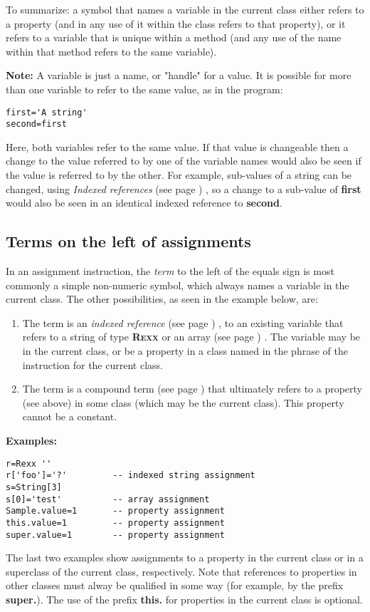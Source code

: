 To summarize: a symbol that names a variable in the current class either
refers to a property (and in any use of it within the class refers to
that property), or it refers to a variable that is unique within a
method (and any use of the name within that method refers to the same
variable).
\begin{shaded}\noindent
\textbf{Note: }
A variable is just a name, or "handle" for a value.
It is possible for more than one variable to refer to the same value, as
in the program:
\begin{lstlisting}
first='A string'
second=first
\end{lstlisting}
Here, both variables refer to the same value.  If that value is
changeable then a change to the value referred to by one of the
variable names would also be seen if the value is referred to by the
other.
For example, sub-values of a \nr{} string can be changed, using
 \emph{Indexed references} (see page \pageref{refinstr}) , so a change to a
sub-value of \textbf{first} would also be seen in an identical indexed
reference to \textbf{second}.
\end{shaded}\indent
\subsection{Terms on the left of assignments}
 
In an assignment instruction, the \emph{term} to the left of the
equals sign is most commonly a simple non-numeric symbol, which
always names a variable in the current class.
The other possibilities, as seen in the example below, are:
\begin{enumerate}
\item 
The term is an  \emph{indexed reference} (see page \pageref{refinstr}) , to an
existing variable that refers to a string of type \textbf{R\textsc{exx}} or an
 array (see page \pageref{refarray}) .
The variable may be in the current class, or be a property in a class
named in the  phrase of the  instruction for
the current class.
\item 
The term is a  compound term (see page \pageref{refcomterm})  that ultimately refers
to a property (see above) in some class (which may be the current class).
This property cannot be a constant.
\end{enumerate}
 \textbf{Examples:}
\begin{lstlisting}
r=Rexx ''
r['foo']='?'         -- indexed string assignment
s=String[3]
s[0]='test'          -- array assignment
Sample.value=1       -- property assignment
this.value=1         -- property assignment
super.value=1        -- property assignment
\end{lstlisting}

The last two examples show assignments to a property in the current
class or in a superclass of the current class, respectively.  Note that
references to properties in other classes must alway be qualified in
some way (for example, by the prefix \textbf{super.}).  The use of the
prefix \textbf{this.} for properties in the current class is optional.
